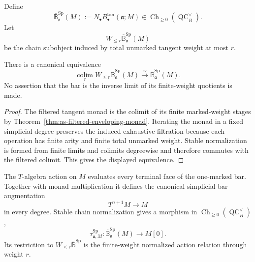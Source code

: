 \begin{definition}
\label{def:as-reduced-principal-bar}
Define
\[
\boxed{
    \overline{\mathbb B}^{\mathrm{Sp}}_{\mathfrak a}(M)
    :=
    N_\bullet B_\bullet^{\mathrm{tan}}(\mathfrak a;M)
    \in
    \operatorname{Ch}_{\geq0}
    \left(\operatorname{QC}^{\vee}_B\right).
}
\]
Let
\[
    W_{\le r}
    \overline{\mathbb B}^{\mathrm{Sp}}_{\mathfrak a}(M)
\]
be the chain subobject induced by total unmarked tangent weight at most $r$.
\end{definition}

\begin{proposition}
\label{prop:as-one-marked-bar-exhaustive}
There is a canonical equivalence
\[
\boxed{
    \operatorname*{colim}_r
    W_{\le r}
    \overline{\mathbb B}^{\mathrm{Sp}}_{\mathfrak a}(M)
    \xrightarrow{\sim}
    \overline{\mathbb B}^{\mathrm{Sp}}_{\mathfrak a}(M).
}
\]
No assertion that the bar is the inverse limit of its finite-weight
quotients is made.
\end{proposition}

\begin{proof}
The filtered tangent monad is the colimit of its finite marked-weight stages
by
Theorem~\ref{thm:as-filtered-enveloping-monad}.  Iterating the monad in a
fixed simplicial degree preserves the induced exhaustive filtration because
each operation has finite arity and finite total unmarked weight.  Stable
normalization is formed from finite limits and colimits degreewise and
therefore commutes with the filtered colimit.  This gives the displayed
equivalence.
\end{proof}

\begin{construction}
\label{def:as-operator-associative-bar}
The $T$-algebra action on $M$ evaluates every terminal face of the one-marked
bar.  Together with monad multiplication it defines the canonical simplicial
bar augmentation
\[
    T^{n+1}M\longrightarrow M
\]
in every degree.  Stable chain normalization gives a morphism in
$\operatorname{Ch}_{\geq0}(\operatorname{QC}^{\vee}_B)$,
\[
\boxed{
    \tau_{\mathfrak a,M}^{\mathrm{Sp}}:
    \overline{\mathbb B}^{\mathrm{Sp}}_{\mathfrak a}(M)
    \longrightarrow M[0].
}
\]
Its restriction to
$W_{\le r}\overline{\mathbb B}^{\mathrm{Sp}}$ is the finite-weight
normalized action relation through weight $r$.
\end{construction}

